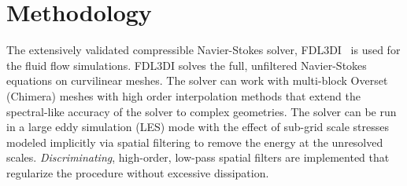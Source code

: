 \documentclass[aps,pra,preprint,groupedaddress]{revtex4-1}
\renewcommand{\=}[1]{\stackrel{#1}{=}} %
\begin{document}
\section{Methodology}
\label{sec:methodology}
The extensively validated compressible Navier-Stokes solver,
FDL3DI~\cite{visbal_2002} is used for the fluid flow simulations. FDL3DI solves
the full, unfiltered Navier-Stokes equations on curvilinear meshes. The solver
can work with multi-block Overset (Chimera) meshes with high order
interpolation methods that extend the spectral-like accuracy of the solver to
complex geometries. The solver can be run in a large eddy simulation (LES) mode
with the effect of sub-grid scale stresses modeled implicitly via spatial
filtering to remove the energy at the unresolved scales. {\em Discriminating},
high-order, low-pass spatial filters are implemented that regularize the
procedure without excessive dissipation. 

\end{document}

